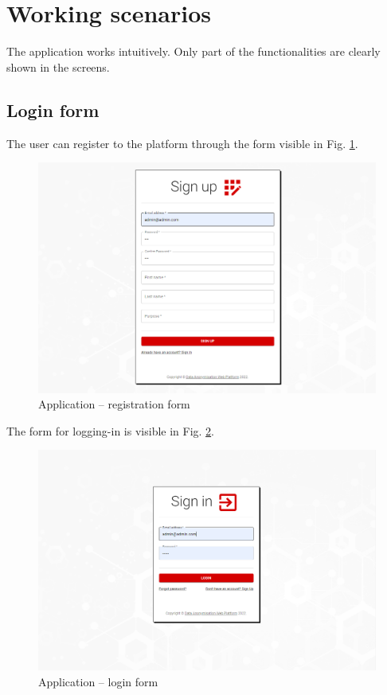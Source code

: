 \documentclass[a4paper,twoside,12pt]{book}
\begin{document}
\section{Working scenarios}



The application works intuitively. Only part of the functionalities are clearly shown in the screens.

\subsection{Login form}

The user can register to the platform through the form visible in Fig. \ref{fig:register1}.

\begin{figure}
  \centering
  \includegraphics[width=\linewidth]{img/app_register.png}
  \caption{Application -- registration form}
  \label{fig:register1}
\end{figure}


The form for logging-in is visible in Fig. \ref{fig:login1}.

\begin{figure}
  \centering
  \includegraphics[width=\linewidth]{img/app_login.png}
  \caption{Application -- login form}
  \label{fig:login1}
\end{figure}
\end{document}
